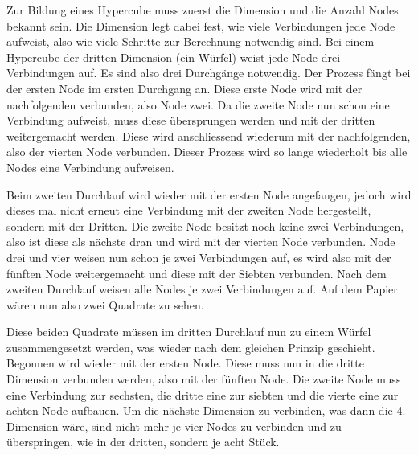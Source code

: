 Zur Bildung eines Hypercube muss zuerst die Dimension und die Anzahl Nodes bekannt sein. Die Dimension legt dabei fest, wie viele Verbindungen jede Node aufweist, also wie viele Schritte zur Berechnung notwendig sind. Bei einem Hypercube der dritten Dimension (ein W\"urfel) weist jede Node drei Verbindungen auf. Es sind also drei Durchg\"ange notwendig. Der Prozess f\"angt bei der ersten Node im ersten Durchgang an. Diese erste Node wird mit der nachfolgenden verbunden, also Node zwei. Da die zweite Node nun schon eine Verbindung aufweist, muss diese \"ubersprungen werden und mit der dritten weitergemacht werden. Diese wird anschliessend wiederum mit der nachfolgenden, also der vierten Node verbunden. Dieser Prozess wird so lange wiederholt bis alle Nodes eine Verbindung aufweisen.

Beim zweiten Durchlauf wird wieder mit der ersten Node angefangen, jedoch wird dieses mal nicht erneut eine Verbindung mit der zweiten Node hergestellt, sondern mit der Dritten. Die zweite Node besitzt noch keine zwei Verbindungen, also ist diese als n\"achste dran und wird mit der vierten Node verbunden. Node drei und vier weisen nun schon je zwei Verbindungen auf, es wird also mit der f\"unften Node weitergemacht und diese mit der Siebten verbunden. Nach dem zweiten Durchlauf weisen alle Nodes je zwei Verbindungen auf. Auf dem Papier w\"aren nun also zwei Quadrate zu sehen.

Diese beiden Quadrate m\"ussen im dritten Durchlauf nun zu einem W\"urfel zusammengesetzt werden, was wieder nach dem gleichen Prinzip geschieht. Begonnen wird wieder mit der ersten Node. Diese muss nun in die dritte Dimension verbunden werden, also mit der f\"unften Node. Die zweite Node muss eine Verbindung zur sechsten, die dritte eine zur siebten und die vierte eine zur achten Node aufbauen. Um die n\"achste Dimension zu verbinden, was dann die 4. Dimension w\"are, sind nicht mehr je vier Nodes zu verbinden und zu \"uberspringen, wie in der dritten, sondern je acht St\"uck.

